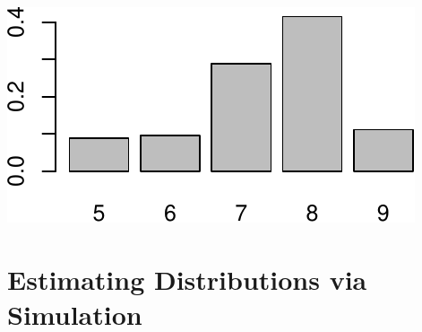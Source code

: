 \documentclass[
]{book}
\theoremstyle{definition}
\theoremstyle{definition}
\theoremstyle{definition}
\theoremstyle{definition}
\theoremstyle{remark}
\begin{document}
\includegraphics{math340-notes_files/figure-latex/unnamed-chunk-136-1.pdf}

\section{Estimating Distributions via Simulation}\label{estimating-distributions-via-simulation}
\end{document}
